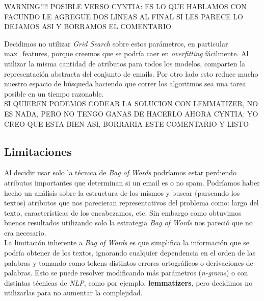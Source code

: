 {\Large WARNING!!!! POSIBLE VERSO
CYNTIA: ES LO QUE HABLAMOS CON FACUNDO LE AGREGUE DOS LINEAS AL FINAL SI LES PARECE LO DEJAMOS ASI Y BORRAMOS EL COMENTARIO}

Decidimos no utilizar \textit{Grid Search} sobre estos parámetros, en particular max\_features, porque creemos que se podría caer en \textit{overfitting} fácilmente. Al utilizar la misma cantidad de atributos para todos los modelos, comparten la representación abstracta del conjunto de emails. Por otro lado esto reduce mucho nuestro espacio de búsqueda haciendo que correr los algoritmos sea una tarea posible en un tiempo razonable.\\

{\Large SI QUIEREN PODEMOS CODEAR LA SOLUCION CON LEMMATIZER, NO ES NADA, PERO NO TENGO GANAS DE HACERLO AHORA
CYNTIA: YO CREO QUE ESTA BIEN ASI, BORRARIA ESTE COMENTARIO Y LISTO}
\subsection{Limitaciones}

Al decidir usar solo la técnica de \textit{Bag of Words} podríamos estar perdiendo atributos importantes que determinan si un email es o no spam. Podríamos haber hecho un análisis sobre la estructura de los mismos y buscar (parseando los textos) atributos que nos parecieran representativos del problema como: largo del texto, características de los encabezamos, etc. Sin embargo como obtuvimos buenos resultados utilizando solo la estrategia \textit{Bag of Words} nos pareció que no era necesario.   \\

La limitación inherente a \textit{Bag of Words} es que simplifica la información que se podría obtener de los textos, ignorando cualquier dependencia en el orden de las palabras y tomando como tokens distintos errores ortográficos o derivaciones de palabras. Esto se puede resolver modificando más parámetros (\textit{n-grams}) o con distintas técnicas de \textit{NLP}, como por ejemplo, \textbf{lemmatizers}, pero decidimos no utilizarlas para no aumentar la complejidad.
